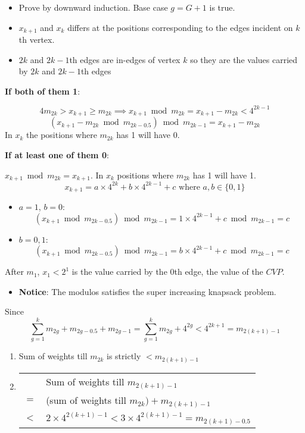 \documentclass[article,10pt]{beamer}%
\begin{document}
\begin{frame}[allowframebreaks]
\begin{itemize}	
	\item Prove by downward induction. Base case $g=G+1$ is true.
	\item $x_{k+1}$ and $x_k$ differs at the positions corresponding to the edges incident on $k$th vertex.
	\item $2k$ and $2k-1$th edges are in-edges of vertex $k$ so they are the values carried by $2k$ and $2k-1$th edges
	
	\end{itemize}
\framebreak

 \textbf{If both of them 1}:
 
  $$4m_{2k}>x_{k+1}\geq m_{2k}\implies x_{k+1}\bmod{m_{2k}}=x_{k+1}-m_{2k}<4^{2k-1}$$  $$(x_{k+1}-m_{2k}\bmod{m_{2k-0.5}})\bmod{m_{2k-1}}=x_{k+1}-m_{2k}$$ In $x_k$ the positions where $m_{2k}$ has 1 will have 0.
  \framebreak
  
\textbf{If at least one of them 0}:

 $x_{k+1}\bmod{m_{2k}}=x_{k+1}$. In $x_k$ positions where $m_{2k}$ has 1 will have 1. $$x_{k+1}=a\times 4^{2k}+b\times 4^{2k-1}+c\text{ where }a,b\in \{0,1\}$$\begin{itemize}
	\item $a=1$, $b=0$: $$(x_{k+1}\bmod{m_{2k-0.5}})\bmod{m_{2k-1}}=1\times 4^{2k-1}+c\bmod{m_{2k-1}}=c$$
	\item $b=0,1$: $$(x_{k+1}\bmod{m_{2k-0.5}})\bmod{m_{2k-1}}=b\times 4^{2k-1}+c\bmod{m_{2k-1}}=c$$
\end{itemize}
\framebreak

After $m_1$, $x_1<2^1$ is the value carried by the 0th edge, the value of the $CVP$.

\begin{itemize}
	\item  \textbf{Notice}: The modulos  satisfies the super increasing knapsack problem. 
\end{itemize} 
 Since $$\sum\limits_{g=1}^{k}m_{2g}+m_{2g-0.5}+m_{2g-1}=\sum\limits_{g=1}^{k}m_{2g}+4^{2g}<4^{2k+1}=m_{2(k+1)-1}$$ 
 \framebreak
 
	\begin{enumerate}
		\item \hspace{1ex} Sum of weights till $m_{2k}$ is strictly $<m_{2(k+1)-1}$
		\item \begin{tabular}[t]{rl}
			& Sum of weights till $m_{2(k+1)-1}$ \\ 
			$=$ &(sum of weights till $m_{2k})+m_{2(k+1)-1}$ \\
		 $<$ & $2\times 4^{2(k+1)-1}<3\times 4^{2(k+1)-1}=m_{2(k+1)-0.5}$
		\end{tabular}
		

\end{enumerate}
\end{frame}
\end{document}
